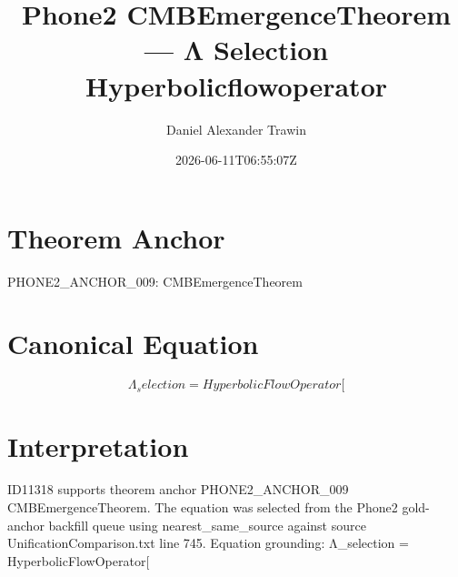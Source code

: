 \documentclass[11pt]{article}
\title{Phone2 CMBEmergenceTheorem — Λ Selection Hyperbolicflowoperator}
\author{Daniel Alexander Trawin}
\date{2026-06-11T06:55:07Z}
\begin{document}
\maketitle
\section*{Theorem Anchor}
PHONE2_ANCHOR_009: CMBEmergenceTheorem
\section*{Canonical Equation}
\[
Λ_selection = HyperbolicFlowOperator[
\]
\section*{Interpretation}
ID11318 supports theorem anchor PHONE2_ANCHOR_009 CMBEmergenceTheorem. The equation was selected from the Phone2 gold-anchor backfill queue using nearest_same_source against source UnificationComparison.txt line 745. Equation grounding: Λ_selection = HyperbolicFlowOperator[
\end{document}
